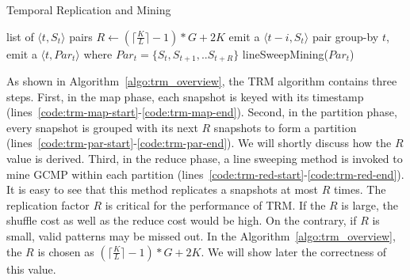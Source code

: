 \begin{algorithm}
\caption{Temporal Replication and Mining}
\label{algo:trm_overview}
\begin{algorithmic}[1]
\Require list of $\langle t, S_t \rangle$ pairs
\State $R \gets (\lceil \frac{K}{L} \rceil -1)*G+2K$
\label{code:trm-map-start}
		\State emit a $\langle t-i, S_t \rangle$ pair
	\EndFor  
\EndFor
\label{code:trm-map-end}
\label{code:trm-par-start}
\State group-by $t$, emit a $\langle t, Par_t\rangle$
\State where $Par_t = \{S_t, S_{t+1}, .. S_{t+R}\} $
\EndFor
\label{code:trm-par-end}
\label{code:trm-red-start}
\State lineSweepMining($Par_t$)
\label{code:trm-red-end}
\EndFor
\end{algorithmic}
\end{algorithm}

As shown in Algorithm~\ref{algo:trm_overview}, the TRM algorithm contains
three steps. First, in the map phase, each snapshot is keyed 
with its timestamp (lines~\ref{code:trm-map-start}-\ref{code:trm-map-end}). 
Second, in the partition phase, every snapshot is grouped with its next 
$R$ snapshots to form a partition (lines~\ref{code:trm-par-start}-\ref{code:trm-par-end}). 
We will shortly discuss how the $R$ value is derived. 
Third, in the reduce phase, a line sweeping method is invoked 
to mine GCMP within each partition (lines~\ref{code:trm-red-start}-\ref{code:trm-red-end}). 
It is easy to see that this method replicates a snapshots at most $R$ times.
The replication factor $R$ is critical for the performance of TRM.
If the $R$ is large, the shuffle cost as well as the reduce cost would be high. 
On the contrary, if $R$ is small, valid patterns may
be missed out. In the Algorithm~\ref{algo:trm_overview}, the 
$R$ is chosen as $(\lceil \frac{K}{L} \rceil -1)*G+2K$. We will show
later the correctness of this value.

